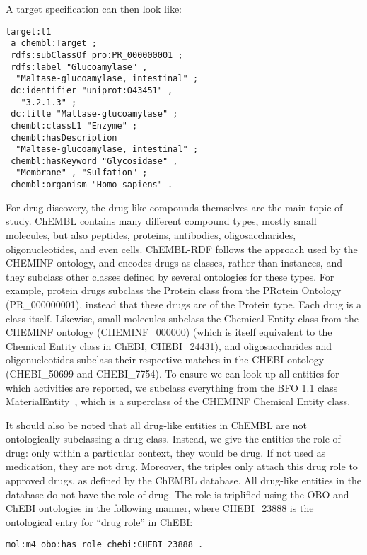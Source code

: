 \documentclass[10pt]{bmc_article}
\newenvironment{bmcformat}{\begin{raggedright}\baselineskip20pt\sloppy\setboolean{publ}{false}}{\end{raggedright}\baselineskip20pt\sloppy}
\begin{document}
\begin{bmcformat}
A target specification can then look like:

\begin{small}
\begin{verbatim}
target:t1
 a chembl:Target ;
 rdfs:subClassOf pro:PR_000000001 ;
 rdfs:label "Glucoamylase" , 
  "Maltase-glucoamylase, intestinal" ;
 dc:identifier "uniprot:O43451" ,
   "3.2.1.3" ;
 dc:title "Maltase-glucoamylase" ;
 chembl:classL1 "Enzyme" ;
 chembl:hasDescription
  "Maltase-glucoamylase, intestinal" ;
 chembl:hasKeyword "Glycosidase" , 
  "Membrane" , "Sulfation" ;
 chembl:organism "Homo sapiens" .
\end{verbatim}
\end{small}

For drug discovery, the drug-like compounds themselves are the main topic of study.
ChEMBL contains many different compound types, mostly small molecules,
but also peptides, proteins, antibodies, oligosaccharides, oligonucleotides, and
even cells. ChEMBL-RDF follows the approach used by the CHEMINF ontology,
and encodes drugs as classes, rather than instances, and they subclass
other classes defined by several ontologies for these types. For example, protein drugs subclass the
Protein class from the PRotein Ontology (PR\_000000001), instead that these drugs are
of the Protein type. Each drug is a class itself. Likewise, small
molecules subclass the Chemical Entity class from the CHEMINF
ontology (CHEMINF\_000000) (which is itself equivalent to the Chemical Entity class in ChEBI, CHEBI\_24431), 
and oligosaccharides and oligonucleotides
subclass their respective matches in the CHEBI ontology (CHEBI\_50699
and CHEBI\_7754). To ensure we can look up all entities for which activities
are reported, we subclass everything from the BFO 1.1 class MaterialEntity~\cite{Smith2004},
which is a superclass of the CHEMINF Chemical Entity class.

It should also be noted that all drug-like entities in ChEMBL are not ontologically
subclassing a drug class. Instead, we give the entities the role of drug: only within a
particular context, they would be drug. If not used as medication, they are not drug.
Moreover, the triples only attach this drug role to approved drugs, as defined by the
ChEMBL database. All drug-like entities in the database do not have the role of drug.
The role is triplified using the OBO and ChEBI ontologies in the following manner,
where CHEBI\_23888 is the ontological entry for ``drug role'' in ChEBI:

\begin{small}
\begin{verbatim}
mol:m4 obo:has_role chebi:CHEBI_23888 .
\end{verbatim}
\end{small}


\end{bmcformat}
\end{document}
